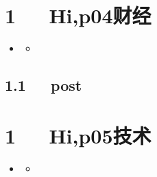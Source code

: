 \documentclass[letterpaper,12pt,english]{sphinxmanual}
\begin{document}
\chapter{1   Hi,p04财经}
\label{\detokenize{p04_u8d22_u7ecf/Hello_uff0cp04_u8d22_u7ecf:hi-p04}}\label{\detokenize{p04_u8d22_u7ecf/Hello_uff0cp04_u8d22_u7ecf::doc}}
\begin{sphinxShadowBox}
\begin{itemize}
\item {} 
\label{\detokenize{p04_u8d22_u7ecf/Hello_uff0cp04_u8d22_u7ecf:id2}}{\hyperref[\detokenize{p04_u8d22_u7ecf/Hello_uff0cp04_u8d22_u7ecf:hi-p04}]{}}
\begin{itemize}
\item {} 
\label{\detokenize{p04_u8d22_u7ecf/Hello_uff0cp04_u8d22_u7ecf:id3}}{\hyperref[\detokenize{p04_u8d22_u7ecf/Hello_uff0cp04_u8d22_u7ecf:post}]{}}

\end{itemize}

\end{itemize}
\end{sphinxShadowBox}


\section{1.1   post}
\label{\detokenize{p04_u8d22_u7ecf/Hello_uff0cp04_u8d22_u7ecf:post}}

\chapter{1   Hi,p05技术}
\label{\detokenize{p05_u6280_u672f/Hello_uff0cp05_u6280_u672f:hi-p05}}\label{\detokenize{p05_u6280_u672f/Hello_uff0cp05_u6280_u672f::doc}}
\begin{sphinxShadowBox}
\begin{itemize}
\item {} 
\label{\detokenize{p05_u6280_u672f/Hello_uff0cp05_u6280_u672f:id2}}{\hyperref[\detokenize{p05_u6280_u672f/Hello_uff0cp05_u6280_u672f:hi-p05}]{}}
\begin{itemize}
\item {} 
\label{\detokenize{p05_u6280_u672f/Hello_uff0cp05_u6280_u672f:id3}}{\hyperref[\detokenize{p05_u6280_u672f/Hello_uff0cp05_u6280_u672f:post}]{}}

\end{itemize}

\end{itemize}
\end{sphinxShadowBox}
\end{document}
